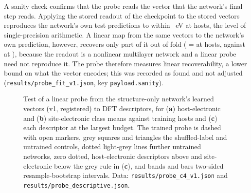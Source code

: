 A sanity check confirms that the probe reads the vector that the network's final step reads. Applying the stored
readout of the checkpoint to the stored vectors reproduces the network's own test predictions to within
\numProbeFitVOneSanityZeroSixHundredFiftyFourHeadReplayMaxAbsDiffEV{}~eV at \numCfgBudgetsHostsItemSix{} hosts, the
level of single-precision arithmetic. A linear map from the same vectors to the network's own prediction, however,
recovers only part of it out of fold (\Rsq{} = \numProbeFitVOneSanityZeroSixHundredFiftyFourProbeToOwnPredictionRTwoOutOfFold{}
at \numCfgBudgetsHostsItemSix{} hosts, against \numProbeFitVOneSanityZeroTwentyFiveProbeToOwnPredictionRTwoOutOfFold{}
at \numCfgBudgetsHostsItemOne{}), because the readout is a nonlinear multilayer network and a linear probe need not
reproduce it. The probe therefore measures linear recoverability, a lower bound on what the vector encodes; this was
recorded as found and not adjusted (\texttt{results/probe\_fit\_v1.json}, key \texttt{payload.sanity}).

\begin{figure}[htbp]
\centering
{}
\caption{Test \Rsq{} of a linear probe from the structure-only network's learned vectors (v1, registered) to DFT
descriptors, for (\textbf{a}) host-electronic and (\textbf{b}) site-electronic class means against training hosts
and (\textbf{c}) each descriptor at the largest budget. The trained probe is dashed with open markers, grey squares
and triangles the shuffled-label and untrained controls, dotted light-grey lines further untrained networks, zero \Rsq{}
dotted, host-electronic descriptors above and site-electronic below the grey rule in (\textbf{c}), and bands and bars
two-sided resample-bootstrap intervals. Data: \texttt{results/probe\_c4\_v1.json} and
\texttt{results/probe\_descriptive.json}.}
\label{fig:probe}
\end{figure}
\FloatBarrier
